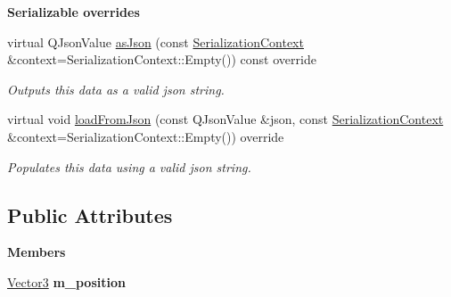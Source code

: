 \begin{Indent}\textbf{ Serializable overrides}\par
\begin{DoxyCompactItemize}
\item 
\mbox{\label{structrev_1_1_translation_aa60c3db4e64f25844751d9f1aa3c81f2}} 
virtual Q\+Json\+Value \mbox{\hyperlink{structrev_1_1_translation_aa60c3db4e64f25844751d9f1aa3c81f2}{as\+Json}} (const \mbox{\hyperlink{structrev_1_1_serialization_context}{Serialization\+Context}} \&context=Serialization\+Context\+::\+Empty()) const override
\begin{DoxyCompactList}\small\item\em Outputs this data as a valid json string. \end{DoxyCompactList}\item 
\mbox{\label{structrev_1_1_translation_a651214522de9398381f532a6f37d724d}} 
virtual void \mbox{\hyperlink{structrev_1_1_translation_a651214522de9398381f532a6f37d724d}{load\+From\+Json}} (const Q\+Json\+Value \&json, const \mbox{\hyperlink{structrev_1_1_serialization_context}{Serialization\+Context}} \&context=Serialization\+Context\+::\+Empty()) override
\begin{DoxyCompactList}\small\item\em Populates this data using a valid json string. \end{DoxyCompactList}\end{DoxyCompactItemize}
\end{Indent}
\subsection*{Public Attributes}
\begin{Indent}\textbf{ Members}\par
\begin{DoxyCompactItemize}
\item 
\mbox{\label{structrev_1_1_translation_ae76322082bb6287fc7e7fc2fa03ce7c2}} 
\mbox{\hyperlink{classrev_1_1_vector}{Vector3}} {\bfseries m\+\_\+position}
\end{DoxyCompactItemize}
\end{Indent}
